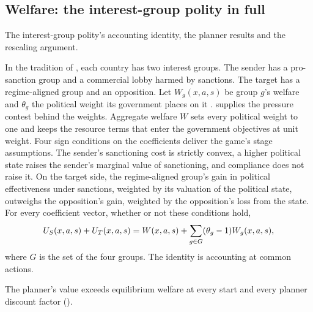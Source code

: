 \subsection{Welfare: the interest-group polity in full}
\label{sec:moved-main-2026-10-13:welfare}

The interest-group polity's accounting identity, the planner results and the
rescaling argument.

 In the tradition of \citet{Kaempfer1988}, each country has two
interest groups. The sender has a pro-sanction group and a commercial lobby harmed
by sanctions. The target has a regime-aligned group and an opposition. Let
$W_g(x,a,s)$ be group $g$'s welfare and $\theta_g$ the political weight its
government places on it \citep{GrossmanHelpman1994}. \citet{Becker1983} supplies
the pressure contest behind the weights. Aggregate welfare $W$
sets every political weight to one and keeps the resource terms that enter the
government objectives at unit weight. Four sign conditions on the coefficients
deliver the game's stage assumptions. The sender's sanctioning cost is strictly
convex, a higher political state raises the sender's marginal value of
sanctioning, and compliance does not raise it. On the target side, the
regime-aligned group's gain in political
effectiveness under sanctions, weighted by its valuation of the political state,
outweighs the opposition's gain, weighted by the opposition's loss from the state.
For every coefficient vector, whether or not these conditions hold,
\begin{equation}
U_S(x,a,s)+U_T(x,a,s)
=W(x,a,s)
+\sum_{g\in G}
(\theta_g-1)W_g(x,a,s),
\label{eq:planner-distortion}
\end{equation}
where $G$ is the set of the four groups. The identity is accounting at common
actions.

 The planner's value exceeds equilibrium welfare at every
start and every planner discount factor ().

